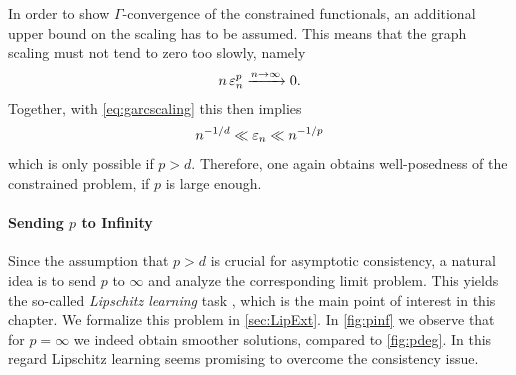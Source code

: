 %
%
In order to show $\Gamma$-convergence of the constrained functionals, an additional upper bound on the scaling has to be assumed. This means that the graph scaling must not tend to zero too slowly, namely
%
\begin{align*}
n\, \varepsilon_n^p \xrightarrow{n\to\infty} 0.	
\end{align*}
%
Together, with \cref{eq:garcscaling} this then implies
%
\begin{align*}
n^{-1/d} \ll \varepsilon_n \ll n^{-1/p}
\end{align*}
%
which is only possible if $p>d$. Therefore, one again obtains well-posedness of the constrained problem, if $p$ is large enough.


\paragraph{Sending $p$ to Infinity} 

Since the assumption that $p>d$ is crucial for asymptotic consistency, a natural idea is to send $p$ to $\infty$ and analyze the corresponding limit problem. This yields the so-called \emph{Lipschitz learning} task \cite{von2004distance, kyng2015algorithms}, which is the main point of interest in this chapter. We formalize this problem in \cref{sec:LipExt}. In \cref{fig:pinf} we observe that for $p=\infty$ we indeed obtain smoother solutions, compared to \cref{fig:pdeg}. In this regard Lipschitz learning seems promising to overcome the consistency issue.

